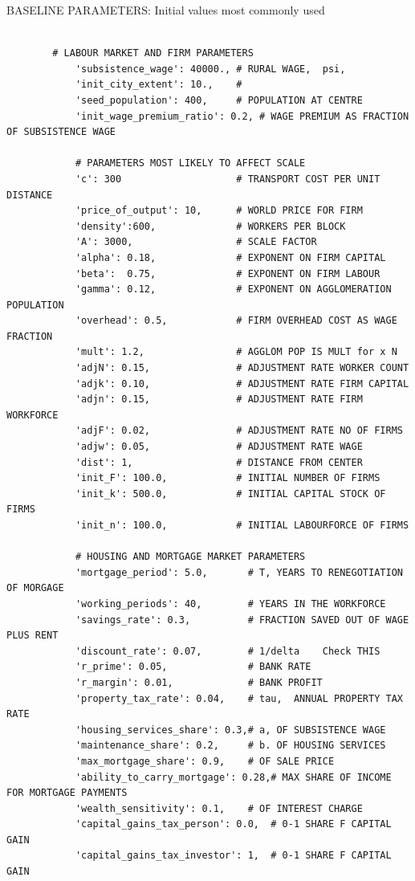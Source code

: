 \documentclass{article}
\begin{document}
{\tiny
BASELINE PARAMETERS: Initial values most commonly used 
\begin{verbatim}

        # LABOUR MARKET AND FIRM PARAMETERS
            'subsistence_wage': 40000., # RURAL WAGE,  psi, 
            'init_city_extent': 10.,    # 
            'seed_population': 400,     # POPULATION AT CENTRE
            'init_wage_premium_ratio': 0.2, # WAGE PREMIUM AS FRACTION OF SUBSISTENCE WAGE

            # PARAMETERS MOST LIKELY TO AFFECT SCALE
            'c': 300                    # TRANSPORT COST PER UNIT DISTANCE
            'price_of_output': 10,      # WORLD PRICE FOR FIRM
            'density':600,              # WORKERS PER BLOCK  
            'A': 3000,                  # SCALE FACTOR 
            'alpha': 0.18,              # EXPONENT ON FIRM CAPITAL
            'beta':  0.75,              # EXPONENT ON FIRM LABOUR
            'gamma': 0.12,              # EXPONENT ON AGGLOMERATION POPULATION
            'overhead': 0.5,            # FIRM OVERHEAD COST AS WAGE FRACTION
            'mult': 1.2,                # AGGLOM POP IS MULT for x N
            'adjN': 0.15,               # ADJUSTMENT RATE WORKER COUNT
            'adjk': 0.10,               # ADJUSTMENT RATE FIRM CAPITAL
            'adjn': 0.15,               # ADJUSTMENT RATE FIRM WORKFORCE
            'adjF': 0.02,               # ADJUSTMENT RATE NO OF FIRMS
            'adjw': 0.05,               # ADJUSTMENT RATE WAGE
            'dist': 1,                  # DISTANCE FROM CENTER
            'init_F': 100.0,            # INITIAL NUMBER OF FIRMS
            'init_k': 500.0,            # INITIAL CAPITAL STOCK OF FIRMS
            'init_n': 100.0,            # INITIAL LABOURFORCE OF FIRMS

            # HOUSING AND MORTGAGE MARKET PARAMETERS
            'mortgage_period': 5.0,       # T, YEARS TO RENEGOTIATION OF MORGAGE
            'working_periods': 40,        # YEARS IN THE WORKFORCE
            'savings_rate': 0.3,          # FRACTION SAVED OUT OF WAGE PLUS RENT
            'discount_rate': 0.07,        # 1/delta    Check THIS
            'r_prime': 0.05,              # BANK RATE          
            'r_margin': 0.01,             # BANK PROFIT          
            'property_tax_rate': 0.04,    # tau,  ANNUAL PROPERTY TAX RATE
            'housing_services_share': 0.3,# a, OF SUBSISTENCE WAGE
            'maintenance_share': 0.2,     # b. OF HOUSING SERVICES
            'max_mortgage_share': 0.9,    # OF SALE PRICE
            'ability_to_carry_mortgage': 0.28,# MAX SHARE OF INCOME  FOR MORTGAGE PAYMENTS
            'wealth_sensitivity': 0.1,    # OF INTEREST CHARGE 
            'capital_gains_tax_person': 0.0,  # 0-1 SHARE F CAPITAL GAIN
            'capital_gains_tax_investor': 1,  # 0-1 SHARE F CAPITAL GAIN
    
\end{verbatim}
}
\newpage
\end{document}
